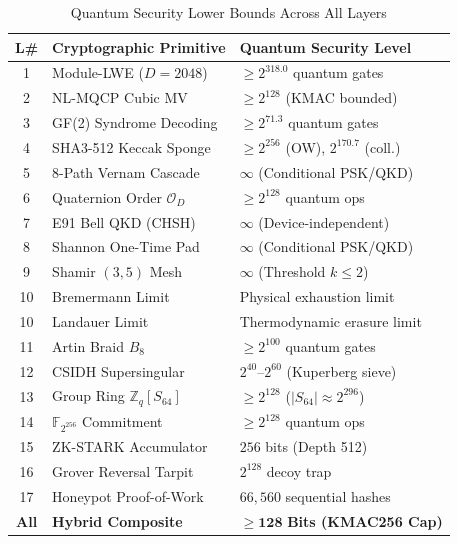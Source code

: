 \documentclass{ieeeaccess}
\newcommand{\Z}{\mathbb{Z}}
\newcommand{\F}{\mathbb{F}}
\newcommand{\calO}{\mathcal{O}}
\begin{document}
\begin{table}[!t]
\centering
\caption{Quantum Security Lower Bounds Across All Layers}
\label{tab:secbounds}
\renewcommand{\arraystretch}{1.15}
\setlength{\tabcolsep}{2.0pt}
\scriptsize
\begin{tabular}{@{}c p{3.2cm} p{3.4cm}@{}}
\toprule
\textbf{L\#} & \textbf{Cryptographic Primitive} & \textbf{Quantum Security Level} \\
\midrule
1  & Module-LWE ($D=2048$)       & $\geq 2^{318.0}$ quantum gates \\
2  & NL-MQCP Cubic MV            & $\geq 2^{128}$ (KMAC bounded) \\
3  & GF(2) Syndrome Decoding     & $\geq 2^{71.3}$ quantum gates \\
4  & SHA3-512 Keccak Sponge      & $\geq 2^{256}$ (OW), $2^{170.7}$ (coll.) \\
5  & 8-Path Vernam Cascade       & $\infty$ (Conditional PSK/QKD) \\
6  & Quaternion Order $\calO_D$  & $\geq 2^{128}$ quantum ops \\
7  & E91 Bell QKD (CHSH)         & $\infty$ (Device-independent) \\
8  & Shannon One-Time Pad        & $\infty$ (Conditional PSK/QKD) \\
9  & Shamir $(3,5)$ Mesh         & $\infty$ (Threshold $k \le 2$) \\
10 & Bremermann Limit            & Physical exhaustion limit \\
10 & Landauer Limit              & Thermodynamic erasure limit \\
11 & Artin Braid $B_8$           & $\geq 2^{100}$ quantum gates \\
12 & CSIDH Supersingular         & $2^{40}$--$2^{60}$ (Kuperberg sieve) \\
13 & Group Ring $\Z_q[S_{64}]$   & $\geq 2^{128}$ ($|S_{64}| \approx 2^{296}$) \\
14 & $\F_{2^{256}}$ Commitment   & $\geq 2^{128}$ quantum ops \\
15 & ZK-STARK Accumulator        & $256$ bits (Depth 512) \\
16 & Grover Reversal Tarpit      & $2^{128}$ decoy trap \\
17 & Honeypot Proof-of-Work      & $66{,}560$ sequential hashes \\
\midrule
\textbf{All} & \textbf{Hybrid Composite} & $\mathbf{\ge 128}$ \textbf{Bits (KMAC256 Cap)} \\
\bottomrule
\end{tabular}
\end{table}
\end{document}
